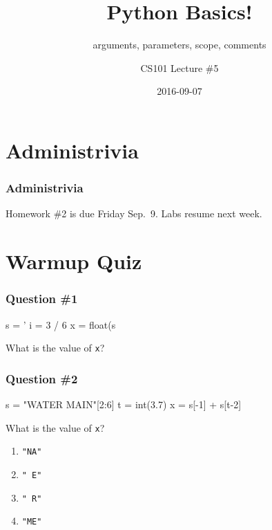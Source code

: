 \documentclass[11pt]{beamer}
\title{Python Basics!}
\subtitle{arguments, parameters, scope, comments}
\author{CS101 Lecture \#5}
\date{2016-09-07}
\begin{document}
  \setcounter{showProgressBar}{0}
  \setcounter{showSlideNumbers}{0}

\frame{\titlepage}

\setcounter{framenumber}{0}
\setcounter{showProgressBar}{1}
\setcounter{showSlideNumbers}{1}

\section{Administrivia}

\begin{frame}
  \frametitle{Administrivia}
  \Enlarge
  \begin{itemize}
  \myitem  Homework \#2 is due Friday Sep.\ 9.
  \myitem  Labs resume next week.
  \end{itemize}
\end{frame}

\section{Warmup Quiz}

\begin{frame}[fragile]
  \frametitle{Question \#1}
  \Enlarge

  \begin{semiverbatim}
s = '%
i = 3 / 6
x = float(s%
  \end{semiverbatim}
  What is the value of \texttt{x}?
\end{frame}

\begin{frame}[fragile]
  \frametitle{Question \#2}
  \Enlarge

  \begin{semiverbatim}
s = "WATER MAIN"[2:6]
t = int(3.7)
x = s[-1] + s[t-2]
  \end{semiverbatim}
  What is the value of \texttt{x}?
  \begin{enumerate}[label=\Alph*]
  \item  \texttt{"NA"}
  \item  \texttt{" E"}
  \item  \texttt{" R"}
  \item  \texttt{"ME"}
  \end{enumerate}
\end{frame}
\end{document}
